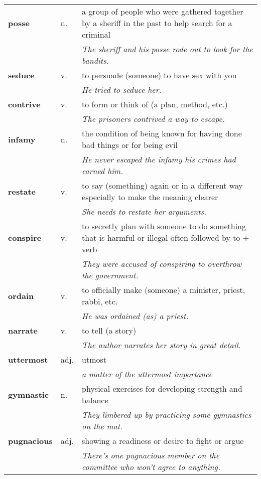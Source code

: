 \documentclass[a4paper]{article}
\begin{document}
\begin{longtable}{llp{11cm}}
\textbf{posse} & n. &  a group of people who were gathered together by a sheriff in the past to help search for a criminal \\
 & & \textit{The sheriff and his posse rode out to look for the bandits.}\\[0.08cm]
\textbf{seduce} & v. &  to persuade (someone) to have sex with you \\
 & & \textit{He tried to seduce her.}\\[0.08cm]
\textbf{contrive} & v. &  to form or think of (a plan, method, etc.) \\
 & & \textit{The prisoners contrived a way to escape.}\\[0.08cm]
\textbf{infamy} & n. &  the condition of being known for having done bad things or for being evil \\
 & & \textit{He never escaped the infamy his crimes had earned him.}\\[0.08cm]
\textbf{restate} & v. &  to say (something) again or in a different way especially to make the meaning clearer \\
 & & \textit{She needs to restate her arguments.}\\[0.08cm]
\textbf{conspire} & v. &  to secretly plan with someone to do something that is harmful or illegal often followed by to + verb \\
 & & \textit{They were accused of conspiring to overthrow the government.}\\[0.08cm]
\textbf{ordain} & v. &  to officially make (someone) a minister, priest, rabbi, etc. \\
 & & \textit{He was ordained (as) a priest.}\\[0.08cm]
\textbf{narrate} & v. &  to tell (a story) \\
 & & \textit{The author narrates her story in great detail.}\\[0.08cm]
\textbf{uttermost} & adj. &  utmost \\
 & & \textit{a matter of the uttermost importance}\\[0.08cm]
\textbf{gymnastic} & n. &  physical exercises for developing strength and balance \\
 & & \textit{They limbered up by practicing some gymnastics on the mat.}\\[0.08cm]
\textbf{pugnacious} & adj. &  showing a readiness or desire to fight or argue \\
 & & \textit{There's one pugnacious member on the committee who won't agree to anything.}\\[0.08cm]

\end{longtable}
\end{document}
